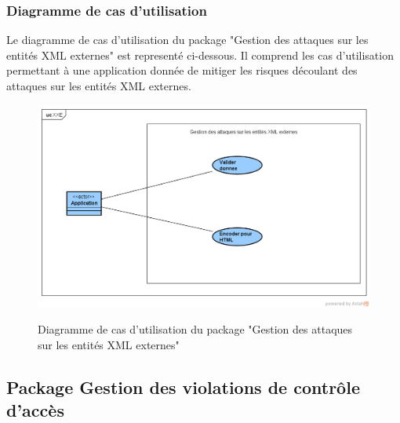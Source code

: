 \subsubsection{Diagramme de cas d'utilisation}
Le diagramme de cas d'utilisation du package "Gestion des attaques sur les entités XML externes" est representé ci-dessous. Il comprend les cas d'utilisation permettant à une application donnée de mitiger les risques découlant des attaques sur les entités XML externes.\\ 
\begin{figure}[H]
	\centering
	\begin{minipage}{12cm}
		\centering
		{\includegraphics[height=0.30\textheight]{fig/XXE-use-case-diagram.png}}
	\end{minipage}
	\caption{Diagramme de cas d'utilisation du package "Gestion des attaques sur les entités XML externes"}
	\label{fig:7.5}
\end{figure}

\subsection{Package Gestion des violations de contrôle d'accès}
